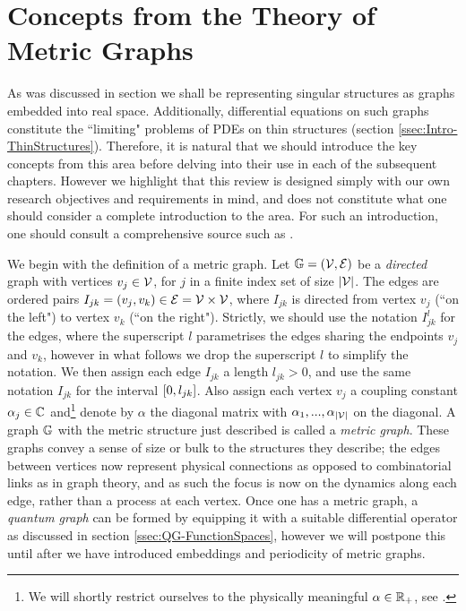\section{Concepts from the Theory of Metric Graphs} \label{sec:QuantumGraphs}
As was discussed in section  we shall be representing singular structures as graphs embedded into real space.
Additionally, differential equations on such graphs constitute the ``limiting" problems of PDEs on thin structures (section \ref{ssec:Intro-ThinStructures}).
Therefore, it is natural that we should introduce the key concepts from this area before delving into their use in each of the subsequent chapters.
However we highlight that this review is designed simply with our own research objectives and requirements in mind, and does not constitute what one should consider a complete introduction to the area.
For such an introduction, one should consult a comprehensive source such as \cite{berkolaiko2013introduction}.

We begin with the definition of a metric graph.
Let $\mathbb{G}=\left( \mathcal{V},\mathcal{E} \right)$ be a \emph{directed} graph with vertices $v_j\in \mathcal{V}$, for $j$ in a finite index set of size $\left\lvert \mathcal{V} \right\rvert$.
The edges are ordered pairs $I_{jk}=\left( v_j, v_k \right)\in \mathcal{E}=\mathcal{V}\times\mathcal{V}$, where $I_{jk}$ is directed from vertex $v_j$ (``on the left") to vertex $v_k$ (``on the right").
Strictly, we should use the notation $I_{jk}^l$ for the edges, where the superscript $l$ parametrises the edges sharing the endpoints $v_j$ and $v_k$, however in what follows we drop the superscript $l$ to simplify the notation.
We then assign each edge $I_{jk}$ a length $l_{jk}>0$, and use the same notation $I_{jk}$ for the interval $\left[ 0,l_{jk} \right]$.
Also assign each vertex $v_j$ a coupling constant $\alpha_j\in\mathbb{C}$ and\footnote{We will shortly restrict ourselves to the physically meaningful $\alpha\in\mathbb{R}_{+}$, see .} denote by $\alpha$ the diagonal matrix with $\alpha_1,...,\alpha_{\left\lvert \mathcal{V} \right\rvert}$ on the diagonal.
A graph $\mathbb{G}$ with the metric structure just described is called a \emph{metric graph}.
These graphs convey a sense of size or bulk to the structures they describe; the edges between vertices now represent physical connections as opposed to combinatorial links as in graph theory, and as such the focus is now on the dynamics along each edge, rather than a process at each vertex.
Once one has a metric graph, a \emph{quantum graph} can be formed by equipping it with a suitable differential operator as discussed in section \ref{ssec:QG-FunctionSpaces}, however we will postpone this until after we have introduced embeddings and periodicity of metric graphs.

